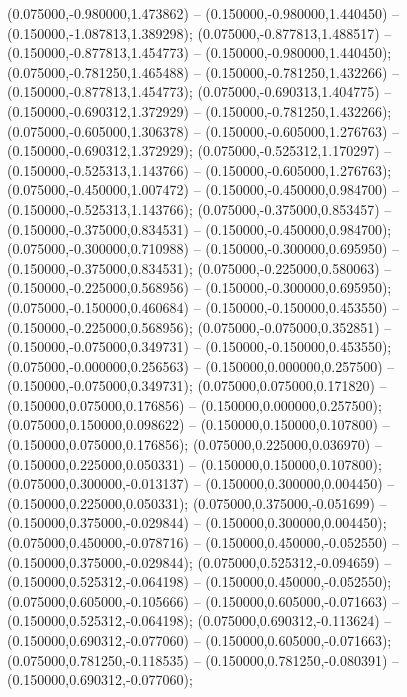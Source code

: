 (0.075000,-0.980000,1.473862) -- (0.150000,-0.980000,1.440450) -- (0.150000,-1.087813,1.389298);
 (0.075000,-0.877813,1.488517) -- (0.150000,-0.877813,1.454773) -- (0.150000,-0.980000,1.440450);
 (0.075000,-0.781250,1.465488) -- (0.150000,-0.781250,1.432266) -- (0.150000,-0.877813,1.454773);
 (0.075000,-0.690313,1.404775) -- (0.150000,-0.690312,1.372929) -- (0.150000,-0.781250,1.432266);
 (0.075000,-0.605000,1.306378) -- (0.150000,-0.605000,1.276763) -- (0.150000,-0.690312,1.372929);
 (0.075000,-0.525312,1.170297) -- (0.150000,-0.525313,1.143766) -- (0.150000,-0.605000,1.276763);
 (0.075000,-0.450000,1.007472) -- (0.150000,-0.450000,0.984700) -- (0.150000,-0.525313,1.143766);
 (0.075000,-0.375000,0.853457) -- (0.150000,-0.375000,0.834531) -- (0.150000,-0.450000,0.984700);
 (0.075000,-0.300000,0.710988) -- (0.150000,-0.300000,0.695950) -- (0.150000,-0.375000,0.834531);
 (0.075000,-0.225000,0.580063) -- (0.150000,-0.225000,0.568956) -- (0.150000,-0.300000,0.695950);
 (0.075000,-0.150000,0.460684) -- (0.150000,-0.150000,0.453550) -- (0.150000,-0.225000,0.568956);
 (0.075000,-0.075000,0.352851) -- (0.150000,-0.075000,0.349731) -- (0.150000,-0.150000,0.453550);
 (0.075000,-0.000000,0.256563) -- (0.150000,0.000000,0.257500) -- (0.150000,-0.075000,0.349731);
 (0.075000,0.075000,0.171820) -- (0.150000,0.075000,0.176856) -- (0.150000,0.000000,0.257500);
 (0.075000,0.150000,0.098622) -- (0.150000,0.150000,0.107800) -- (0.150000,0.075000,0.176856);
 (0.075000,0.225000,0.036970) -- (0.150000,0.225000,0.050331) -- (0.150000,0.150000,0.107800);
 (0.075000,0.300000,-0.013137) -- (0.150000,0.300000,0.004450) -- (0.150000,0.225000,0.050331);
 (0.075000,0.375000,-0.051699) -- (0.150000,0.375000,-0.029844) -- (0.150000,0.300000,0.004450);
 (0.075000,0.450000,-0.078716) -- (0.150000,0.450000,-0.052550) -- (0.150000,0.375000,-0.029844);
 (0.075000,0.525312,-0.094659) -- (0.150000,0.525312,-0.064198) -- (0.150000,0.450000,-0.052550);
 (0.075000,0.605000,-0.105666) -- (0.150000,0.605000,-0.071663) -- (0.150000,0.525312,-0.064198);
 (0.075000,0.690312,-0.113624) -- (0.150000,0.690312,-0.077060) -- (0.150000,0.605000,-0.071663);
 (0.075000,0.781250,-0.118535) -- (0.150000,0.781250,-0.080391) -- (0.150000,0.690312,-0.077060);
